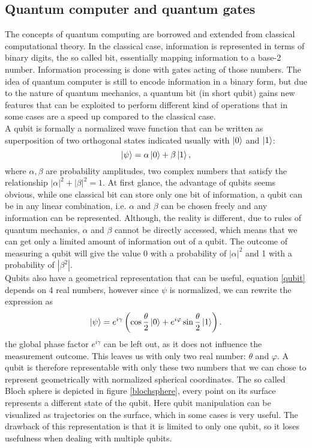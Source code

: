 \subsection{Quantum computer and quantum gates}
The concepts of quantum computing are borrowed and extended from classical computational theory. In the classical case, information is represented in terms of binary digits, the so called bit, essentially mapping information to a base-2 number. Information processing is done with gates acting of those numbers. The idea of quantum computer is still to encode information in a binary form, but due to the nature of quantum mechanics, a quantum bit (in short qubit) gains new features that can be exploited to perform different kind of operations that in some cases are a speed up compared to the classical case.\\
A qubit is formally a normalized wave function that can be written as superposition of two orthogonal states indicated usually with $\ket{0}$ and $\ket{1}$:
\begin{equation}
\label{qubit}
\ket{\psi} = \alpha \ket{0} + \beta\ket{1},
\end{equation}
where $\alpha,\beta$ are probability amplitudes, two complex numbers that satisfy the relationship $|\alpha|^2+|\beta|^2 = 1$.
At first glance, the advantage of qubits seems obvious, while one classical bit can store only one bit of information, a qubit can be in any linear combination, i.e. $\alpha$ and $\beta$ can be chosen freely and any information can be represented. Although, the reality is different, due to rules of quantum mechanics, $\alpha$ and $\beta$ cannot be directly accessed, which means that we can get only a limited amount of information out of a qubit. The outcome of measuring a qubit will give the value 0 with a probability of $|\alpha|^2$ and 1 with a probability of $|\beta^2|$.\\
Qubits also have a geometrical representation that can be useful, equation \eqref{qubit} depends on 4 real numbers, however since $\psi$ is normalized, we can rewrite the expression as
\begin{equation}
\ket{\psi} = e^{i\gamma}\left(\cos\frac{\theta}{2}\ket{0} + e^{i\varphi}\sin\frac{\theta}{2}\ket{1}\right).
\end{equation}
the global phase factor $e^{i\gamma}$ can be left out, as it does not influence the measurement outcome. This leaves us with only two real number: $\theta$ and $\varphi$. A qubit is therefore representable with only these two numbers that we can chose to represent geometrically with normalized spherical coordinates. The so called Bloch sphere is depicted in figure \ref{blochsphere}, every point on its surface represents a different state of the qubit. Here qubit manipulation can be visualized as trajectories on the surface, which in some cases is very useful. The drawback of this representation is that it is limited to only one qubit, so it loses usefulness when dealing with multiple qubits.
